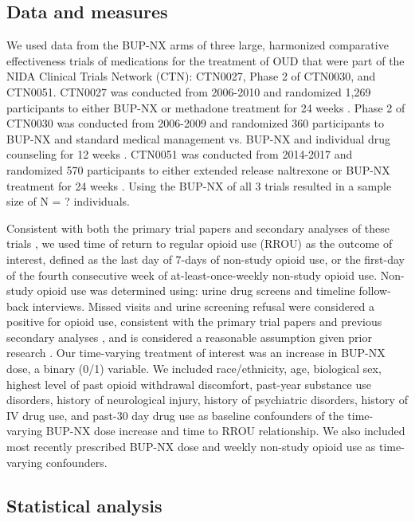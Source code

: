 \documentclass[11pt]{article}
\begin{document}
\subsection*{Data and measures}
We used data from the BUP-NX arms of three large, harmonized comparative effectiveness trials of medications for the treatment of OUD that were part of the NIDA Clinical Trials Network (CTN): CTN0027, Phase 2 of CTN0030, and CTN0051. CTN0027 was conducted from 2006-2010 and randomized 1,269 participants to either BUP-NX or methadone treatment for 24 weeks \citep{potter2013buprenorphine,saxon2013buprenorphine}. Phase 2 of CTN0030 was conducted from 2006-2009 and randomized 360 participants to BUP-NX and standard medical management vs. BUP-NX and individual drug counseling for 12 weeks \citep{weiss2010multi}. CTN0051 was conducted from 2014-2017 and randomized 570 participants to either extended release naltrexone or BUP-NX treatment for 24 weeks \citep{lee2018comparative}. Using the BUP-NX of all 3 trials resulted in a sample size of N = ? individuals. 

Consistent with both the primary trial papers \citep{} and secondary analyses of these trials \citep{rudolph2022dose}, we used time of return to regular opioid use (RROU) as the outcome of interest, defined as the last day of 7-days of non-study opioid use, or the first-day of the fourth consecutive week of at-least-once-weekly non-study opioid use. Non-study opioid use was determined using: urine drug screens and timeline follow-back interviews. Missed visits and urine screening refusal were considered a positive for opioid use, consistent with the primary trial papers and previous secondary analyses \citep{}, and is considered a reasonable assumption given prior research \citep{}. Our time-varying treatment of interest was an increase in BUP-NX dose, a binary (0/1) variable. We included race/ethnicity, age, biological sex, highest level of past opioid withdrawal discomfort, past-year substance use disorders, history of neurological injury, history of psychiatric disorders, history of IV drug use, and past-30 day drug use as baseline confounders of the time-varying BUP-NX dose increase and time to RROU relationship. We also included most recently prescribed BUP-NX dose and weekly non-study opioid use as time-varying confounders.

\subsection{Statistical analysis}
\end{document}
